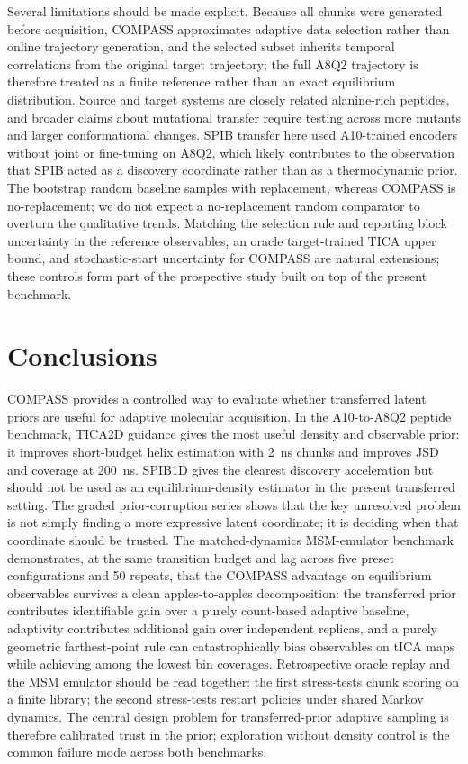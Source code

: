 \documentclass[journal=jctcce,manuscript=article,layout=twocolumn]{achemso}
\begin{document}
Several limitations should be made explicit.
Because all chunks were generated before acquisition, COMPASS approximates adaptive data selection rather than online trajectory generation, and the selected subset inherits temporal correlations from the original target trajectory; the full A8Q2 trajectory is therefore treated as a finite reference rather than an exact equilibrium distribution.
Source and target systems are closely related alanine-rich peptides, and broader claims about mutational transfer require testing across more mutants and larger conformational changes.
SPIB transfer here used A10-trained encoders without joint or fine-tuning on A8Q2, which likely contributes to the observation that SPIB acted as a discovery coordinate rather than as a thermodynamic prior.
The bootstrap random baseline samples with replacement, whereas COMPASS is no-replacement; we do not expect a no-replacement random comparator to overturn the qualitative trends.
Matching the selection rule and reporting block uncertainty in the reference observables, an oracle target-trained TICA upper bound, and stochastic-start uncertainty for COMPASS are natural extensions; these controls form part of the prospective study built on top of the present benchmark.

\section{Conclusions}

COMPASS provides a controlled way to evaluate whether transferred latent priors are useful for adaptive molecular acquisition. In the A10-to-A8Q2 peptide benchmark, TICA2D guidance gives the most useful density and observable prior: it improves short-budget helix estimation with \SI{2}{ns} chunks and improves JSD and coverage at \SI{200}{ns}. SPIB1D gives the clearest discovery acceleration but should not be used as an equilibrium-density estimator in the present transferred setting. The graded prior-corruption series shows that the key unresolved problem is not simply finding a more expressive latent coordinate; it is deciding when that coordinate should be trusted. The matched-dynamics MSM-emulator benchmark demonstrates, at the same transition budget and lag across five preset configurations and 50 repeats, that the COMPASS advantage on equilibrium observables survives a clean apples-to-apples decomposition: the transferred prior contributes identifiable gain over a purely count-based adaptive baseline, adaptivity contributes additional gain over independent replicas, and a purely geometric farthest-point rule can catastrophically bias observables on tICA maps while achieving among the lowest bin coverages. Retrospective oracle replay and the MSM emulator should be read together: the first stress-tests chunk scoring on a finite library; the second stress-tests restart policies under shared Markov dynamics. The central design problem for transferred-prior adaptive sampling is therefore calibrated trust in the prior; exploration without density control is the common failure mode across both benchmarks.
\end{document}

